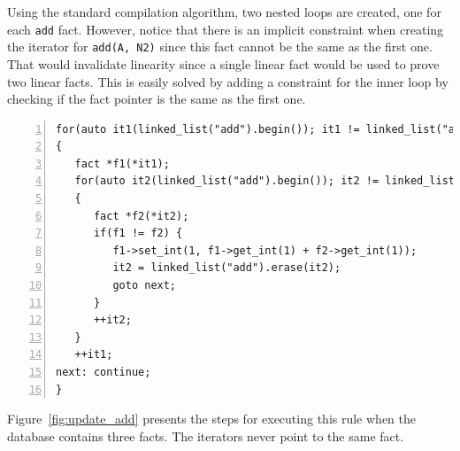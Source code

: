 Using the standard compilation algorithm, two nested loops are created, one for
each \texttt{add} fact. However, notice that there is an implicit constraint
when creating the iterator for \texttt{add(A, N2)} since this fact cannot be the
same as the first one. That would invalidate linearity since a single linear fact would
be used to prove two linear facts. This is easily solved by adding a constraint
for the inner loop by checking if the fact pointer is the same as the first one.

\begin{Verbatim}[numbers=left,fontsize=\codesize]
for(auto it1(linked_list("add").begin()); it1 != linked_list("add").end(); )
{
   fact *f1(*it1);
   for(auto it2(linked_list("add").begin()); it2 != linked_list("add").end(); )
   {
      fact *f2(*it2);
      if(f1 != f2) {
         f1->set_int(1, f1->get_int(1) + f2->get_int(1));
         it2 = linked_list("add").erase(it2);
         goto next;
      }
      ++it2;
   }
   ++it1;
next: continue;
}
\end{Verbatim}

Figure~\ref{fig:update_add} presents the steps for executing this rule when the
database contains three facts. The iterators never point to the same fact.

